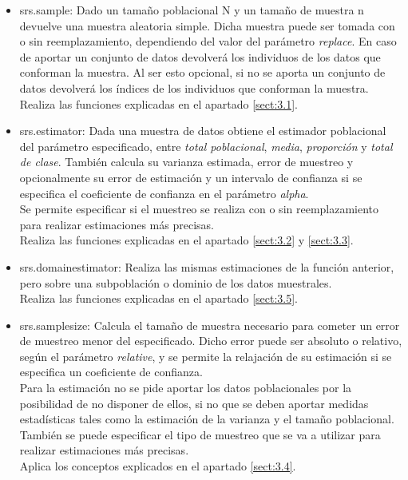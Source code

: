 \begin{itemize}[label=$\bullet$]
    \item srs.sample: Dado un tamaño poblacional N y un tamaño de muestra n devuelve una muestra aleatoria simple. Dicha muestra puede ser tomada con o sin reemplazamiento, dependiendo del valor del parámetro \textit{replace}. En caso de aportar un conjunto de datos devolverá los individuos de los datos que conforman la muestra. Al ser esto opcional, si no se aporta un conjunto de datos devolverá los índices de los individuos que conforman la muestra.\\

    Realiza las funciones explicadas en el apartado \ref{sect:3.1}.

    \item srs.estimator: Dada una muestra de datos obtiene el estimador poblacional del parámetro especificado, entre \textit{total poblacional}, \textit{media}, \textit{proporción} y \textit{total de clase}. También calcula su varianza estimada, error de muestreo y opcionalmente su error de estimación y un intervalo de confianza si se especifica el coeficiente de confianza en el parámetro \textit{alpha}. \\

    Se permite especificar si el muestreo se realiza con o sin reemplazamiento para realizar estimaciones más precisas.\\

    Realiza las funciones explicadas en el apartado \ref{sect:3.2} y \ref{sect:3.3}.

    \item srs.domainestimator: Realiza las mismas estimaciones de la función anterior, pero sobre una subpoblación o dominio de los datos muestrales.\\

    Realiza las funciones explicadas en el apartado \ref{sect:3.5}.

    \item srs.samplesize: Calcula el tamaño de muestra necesario para cometer un error de muestreo menor del especificado. Dicho error puede ser absoluto o relativo, según el parámetro \textit{relative}, y se permite la relajación de su estimación si se especifica un coeficiente de confianza. \\

    Para la estimación no se pide aportar los datos poblacionales por la posibilidad de no disponer de ellos, si no que se deben aportar medidas estadísticas tales como la estimación de la varianza y el tamaño poblacional. También se puede especificar el tipo de muestreo que se va a utilizar para realizar estimaciones más precisas.\\

    Aplica los conceptos explicados en el apartado \ref{sect:3.4}.


\end{itemize}
